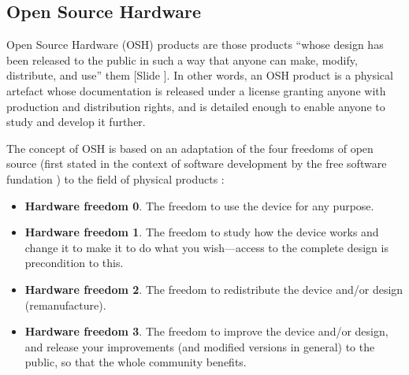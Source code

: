 \documentclass{article}
\newcounter{slide}
\begin{document}
\subsection{Open Source Hardware}
\label{sec:OSH}
Open Source Hardware (OSH) products are those products ``whose design has been released to the public in such a way that anyone can make, modify, distribute, and use'' them \cite{opensourcehardwareassociationOpenSourceHardware2016} {\color{blue}[Slide ]}. In other words, an OSH product is a physical artefact whose documentation is released under a license granting anyone with production and distribution rights, and is detailed enough to enable anyone to study and develop it further. 

The concept of OSH is based on an adaptation of the four freedoms of open source (first stated in the context of software development by the free software fundation \cite{freesoftwarefoundationFreeSoftwareDefinition2015}) to the field of physical products \cite{powellDemocratizingProductionOpen2012}: 
\begin{itemize}
	\item \textbf{Hardware freedom 0}. The freedom to use the device for any purpose.
	\item \textbf{Hardware freedom 1}. The freedom to study how the device works and change it to make it to do what you wish---access to the complete design is precondition to this.
	\item \textbf{Hardware freedom 2}. The freedom to redistribute the device and/or design (remanufacture).
	\item \textbf{Hardware freedom 3}. The freedom to improve the device and/or design, and release your improvements (and modified versions in general) to the public, so that the whole community benefits.
\end{itemize}
\end{document}
